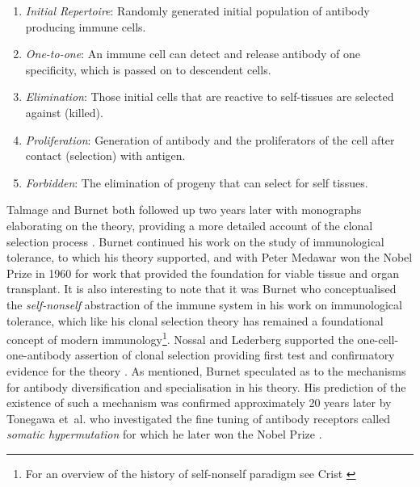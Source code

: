 \begin{enumerate}
	\item \emph{Initial Repertoire}: Randomly generated initial population of antibody producing immune cells.
	\item \emph{One-to-one}: An immune cell can detect and release antibody of one specificity, which is passed on to descendent cells.
	\item \emph{Elimination}: Those initial cells that are reactive to self-tissues are selected against (killed).
	\item \emph{Proliferation}: Generation of antibody and the proliferators of the cell after contact (selection) with antigen.
	\item \emph{Forbidden}: The elimination of progeny that can select for self tissues.
\end{enumerate}

Talmage and Burnet both followed up two years later with monographs elaborating on the theory, providing a more detailed account of the clonal selection process \cite{Talmage1959, Burnet1959}. Burnet continued his work on the study of immunological tolerance, to which his theory supported, and with Peter Medawar won the Nobel Prize in 1960 for work that provided the foundation for viable tissue and organ transplant. It is also interesting to note that it was Burnet who conceptualised the \emph{self-nonself} abstraction of the immune system in his work on immunological tolerance, which like his clonal selection theory has remained a foundational concept of modern immunology\footnote{For an overview of the history of self-nonself paradigm see Crist \cite{Crist2000}}. Nossal and Lederberg supported the one-cell-one-antibody assertion of clonal selection providing first test and confirmatory evidence for the theory \cite{Nossal1958}. As mentioned, Burnet speculated as to the mechanisms for antibody diversification and specialisation in his theory. His prediction of the existence of such a mechanism was confirmed approximately 20 years later by Tonegawa et~al. who investigated the fine tuning of antibody receptors called \emph{somatic hypermutation} for which he later won the Nobel Prize \cite{Hozumi1976, Tonegawa1988}.

%
%
